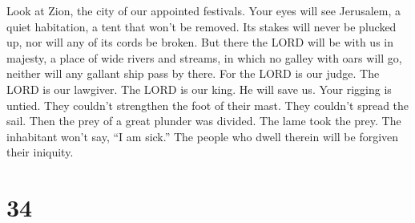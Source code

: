  Look at Zion, the city of our appointed festivals. Your
eyes will see Jerusalem, a quiet habitation, a tent that won't be
removed. Its stakes will never be plucked up, nor will any of its cords
be broken.  But there the LORD will be with us in
majesty, a place of wide rivers and streams, in which no galley with
oars will go, neither will any gallant ship pass by there.
 For the LORD is our judge. The LORD is our lawgiver. The
LORD is our king. He will save us.  Your rigging is
untied. They couldn't strengthen the foot of their mast. They couldn't
spread the sail. Then the prey of a great plunder was divided. The lame
took the prey.  The inhabitant won't say, ``I am sick.''
The people who dwell therein will be forgiven their iniquity.

\hypertarget{section-33}{%
\section{34}\label{section-33}}

